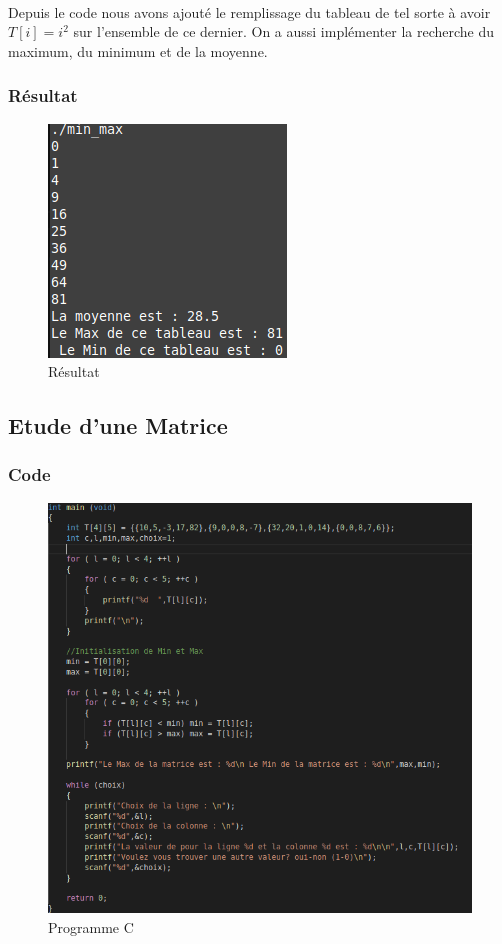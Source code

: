 \documentclass[10pt,a4paper]{article}
\begin{document}
\paragraph{}
Depuis le code nous avons ajouté le remplissage du tableau de tel sorte à avoir $T[i]=i^2$ sur l'ensemble de ce dernier. On a aussi 
implémenter la recherche du maximum, du minimum et de la moyenne.
\subsubsection{Résultat}
\begin{figure}[h] 
\begin{center}
\includegraphics[scale=.3]{images/tab_1_ex}
\end{center}
\caption{Résultat}
\end{figure}



\subsection{Etude d'une Matrice}
\subsubsection{Code}
\begin{figure}[h]
\begin{center}
\includegraphics[scale=.3]{images/matrice_c}
\end{center}
\caption{Programme C}
\end{figure}
\end{document}
